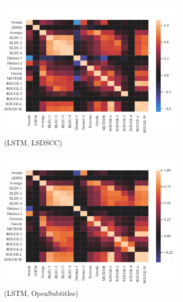 \begin{figure}[htbp]
\begin{subfigure}{0.40\linewidth}
        \includegraphics[width=\linewidth]{figure/plot/heatmap/v2/pearson/lstm/lsdscc/plot.pdf}
        \caption{(LSTM, LSDSCC)}
    \end{subfigure}%
    \begin{subfigure}{0.40\linewidth}
        \centering
        \includegraphics[width=\linewidth]{figure/plot/heatmap/v2/pearson/lstm/opensub/plot.pdf}
        \caption{(LSTM, OpenSubtitles)}
    \end{subfigure}%
    \begin{subfigure}{0.40\linewidth}
        \centering

\end{subfigure}
\end{figure}
